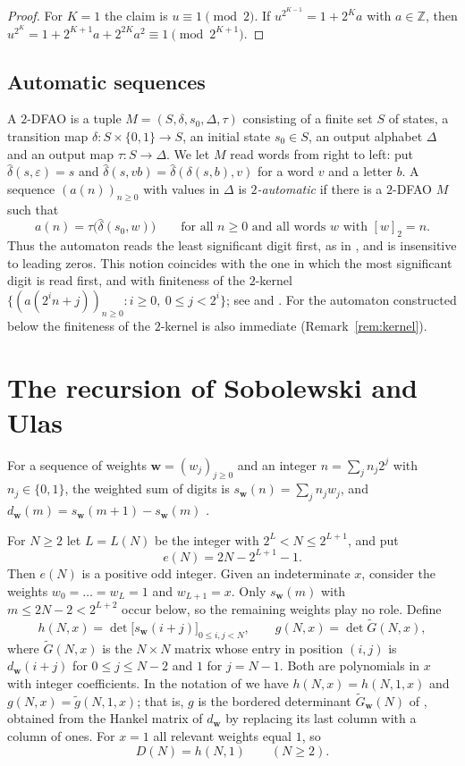 \documentclass{amsart}
\theoremstyle{definition}
\theoremstyle{remark}
\numberwithin{equation}{section}
\newcommand{\Z}{\mathbb{Z}}
\newcommand{\val}[1]{[#1]_2}
\begin{document}
\begin{proof}
For $K=1$ the claim is $u\equiv1\pmod 2$. If $u^{2^{K-1}}=1+2^Ka$ with $a\in\Z$, then $u^{2^K}=1+2^{K+1}a+2^{2K}a^2\equiv1\pmod{2^{K+1}}$.
\end{proof}

\subsection{Automatic sequences}
A $2$-DFAO is a tuple $M=(S,\delta,s_0,\Delta,\tau)$ consisting of a finite set $S$ of states, a transition map $\delta\colon S\times\{0,1\}\to S$, an initial state $s_0\in S$, an output alphabet $\Delta$ and an output map $\tau\colon S\to\Delta$. We let $M$ read words from right to left: put $\hat\delta(s,\varepsilon)=s$ and $\hat\delta(s,vb)=\hat\delta(\delta(s,b),v)$ for a word $v$ and a letter $b$. A sequence $(a(n))_{n\ge0}$ with values in $\Delta$ is \emph{$2$-automatic} if there is a $2$-DFAO $M$ such that
\[
a(n)=\tau\bigl(\hat\delta(s_0,w)\bigr)\qquad\text{for all $n\ge0$ and all words $w$ with $\val{w}=n$.}
\]
Thus the automaton reads the least significant digit first, as in \cite{HH}, and is insensitive to leading zeros. This notion coincides with the one in which the most significant digit is read first, and with finiteness of the $2$-kernel $\{(a(2^in+j))_{n\ge0}:i\ge0,\ 0\le j<2^i\}$; see \cite[Section~5.2 and Theorem~6.6.2]{AS} and \cite[Proposition~V.3.3]{Eil}. For the automaton constructed below the finiteness of the $2$-kernel is also immediate (Remark~\ref{rem:kernel}).

\section{The recursion of Sobolewski and Ulas}\label{sec:SU}

For a sequence of weights $\mathbf w=(w_j)_{j\ge0}$ and an integer $n=\sum_j n_j2^j$ with $n_j\in\{0,1\}$, the weighted sum of digits is $s_{\mathbf w}(n)=\sum_j n_jw_j$, and $d_{\mathbf w}(m)=s_{\mathbf w}(m+1)-s_{\mathbf w}(m)$ \cite{SU}.

For $N\ge2$ let $L=L(N)$ be the integer with $2^L<N\le2^{L+1}$, and put
\[
e(N)=2N-2^{L+1}-1.
\]
Then $e(N)$ is a positive odd integer. Given an indeterminate $x$, consider the weights $w_0=\dots=w_L=1$ and $w_{L+1}=x$. Only $s_{\mathbf w}(m)$ with $m\le 2N-2<2^{L+2}$ occur below, so the remaining weights play no role. Define
\[
h(N,x)=\det\bigl[s_{\mathbf w}(i+j)\bigr]_{0\le i,j<N},
\qquad
g(N,x)=\det\widetilde G(N,x),
\]
where $\widetilde G(N,x)$ is the $N\times N$ matrix whose entry in position $(i,j)$ is $d_{\mathbf w}(i+j)$ for $0\le j\le N-2$ and $1$ for $j=N-1$. Both are polynomials in $x$ with integer coefficients. In the notation of \cite[Section~4.1]{SU} we have $h(N,x)=h(N,1,x)$ and $g(N,x)=\tilde g(N,1,x)$; that is, $g$ is the bordered determinant $\widetilde{G}_{\mathbf w}(N)$ of \cite[Section~3]{SU}, obtained from the Hankel matrix of $d_{\mathbf w}$ by replacing its last column with a column of ones. For $x=1$ all relevant weights equal $1$, so
\begin{equation}\label{eq:Dh}
D(N)=h(N,1)\qquad(N\ge2).
\end{equation}
\end{document}
